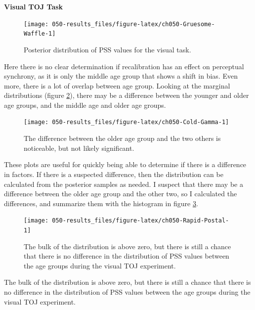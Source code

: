 \documentclass[11pt, oneside, openany]{scrbook}
\begin{document}
\textbf{Visual TOJ Task}

\begin{figure}

{\centering \texttt{[image: 050-results\_files/figure-latex/ch050-Gruesome-Waffle-1]} 

}

\caption{Posterior distribution of PSS values for the visual task.}\label{fig:ch050-Gruesome-Waffle}
\end{figure}

Here there is no clear determination if recalibration has an effect on perceptual synchrony, as it is only the middle age group that shows a shift in bias. Even more, there is a lot of overlap between age group. Looking at the marginal distributions (figure \ref{fig:ch050-Cold-Gamma}), there may be a difference between the younger and older age groups, and the middle age and older age groups.

\begin{figure}

{\centering \texttt{[image: 050-results\_files/figure-latex/ch050-Cold-Gamma-1]} 

}

\caption{The difference between the older age group and the two others is noticeable, but not likely significant.}\label{fig:ch050-Cold-Gamma}
\end{figure}

These plots are useful for quickly being able to determine if there is a difference in factors. If there is a suspected difference, then the distribution can be calculated from the posterior samples as needed. I suspect that there may be a difference between the older age group and the other two, so I calculated the differences, and summarize them with the histogram in figure \ref{fig:ch050-Rapid-Postal}.

\begin{figure}

{\centering \texttt{[image: 050-results\_files/figure-latex/ch050-Rapid-Postal-1]} 

}

\caption{The bulk of the distribution is above zero, but there is still a chance that there is no difference in the distribution of PSS values between the age groups during the visual TOJ experiment.}\label{fig:ch050-Rapid-Postal}
\end{figure}

The bulk of the distribution is above zero, but there is still a chance that there is no difference in the distribution of PSS values between the age groups during the visual TOJ experiment.
\end{document}
